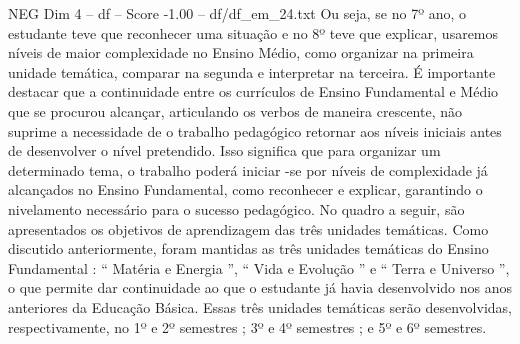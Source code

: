 \begin{textsample}{NEG Dim 4 – df – Score -1.00 – df/df\_em\_24.txt}
Ou seja, se no 7º ano, o estudante teve que reconhecer uma situação e no 8º teve que explicar, usaremos níveis de maior complexidade no Ensino Médio, como organizar na primeira unidade temática, comparar na segunda e interpretar na terceira.
É importante destacar que a continuidade entre os currículos de Ensino Fundamental e Médio que se procurou alcançar, articulando os verbos de maneira crescente, não suprime a necessidade de o trabalho pedagógico retornar aos níveis iniciais antes de desenvolver o nível pretendido.
Isso significa que para organizar um determinado tema, o trabalho poderá iniciar -se por níveis de complexidade já alcançados no Ensino Fundamental, como reconhecer e explicar, garantindo o nivelamento necessário para o sucesso pedagógico.
No quadro a seguir, são apresentados os objetivos de aprendizagem das três unidades temáticas.
Como discutido anteriormente, foram mantidas as três unidades temáticas do Ensino Fundamental : “ Matéria e Energia ”, “ Vida e Evolução ” e “ Terra e Universo ”, o que permite dar continuidade ao que o estudante já havia desenvolvido nos anos anteriores da Educação Básica.
Essas três unidades temáticas serão desenvolvidas, respectivamente, no 1º e 2º semestres ; 3º e 4º semestres ; e 5º e 6º semestres.

\end{textsample}
